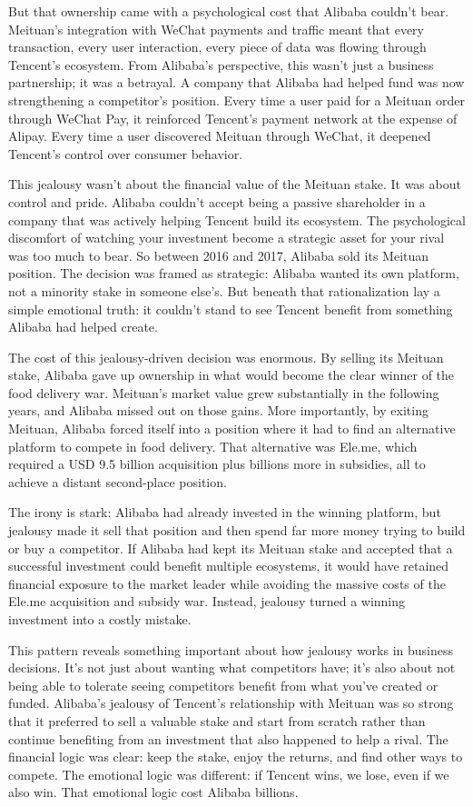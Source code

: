 But that ownership came with a psychological cost that Alibaba couldn't bear. Meituan's integration with WeChat payments and traffic meant that every transaction, every user interaction, every piece of data was flowing through Tencent's ecosystem. From Alibaba's perspective, this wasn't just a business partnership; it was a betrayal. A company that Alibaba had helped fund was now strengthening a competitor's position. Every time a user paid for a Meituan order through WeChat Pay, it reinforced Tencent's payment network at the expense of Alipay. Every time a user discovered Meituan through WeChat, it deepened Tencent's control over consumer behavior.

This jealousy wasn't about the financial value of the Meituan stake. It was about control and pride. Alibaba couldn't accept being a passive shareholder in a company that was actively helping Tencent build its ecosystem. The psychological discomfort of watching your investment become a strategic asset for your rival was too much to bear. So between 2016 and 2017, Alibaba sold its Meituan position. The decision was framed as strategic: Alibaba wanted its own platform, not a minority stake in someone else's. But beneath that rationalization lay a simple emotional truth: it couldn't stand to see Tencent benefit from something Alibaba had helped create.

The cost of this jealousy-driven decision was enormous. By selling its Meituan stake, Alibaba gave up ownership in what would become the clear winner of the food delivery war. Meituan's market value grew substantially in the following years, and Alibaba missed out on those gains. More importantly, by exiting Meituan, Alibaba forced itself into a position where it had to find an alternative platform to compete in food delivery. That alternative was Ele.me, which required a USD 9.5 billion acquisition plus billions more in subsidies, all to achieve a distant second-place position.

The irony is stark: Alibaba had already invested in the winning platform, but jealousy made it sell that position and then spend far more money trying to build or buy a competitor. If Alibaba had kept its Meituan stake and accepted that a successful investment could benefit multiple ecosystems, it would have retained financial exposure to the market leader while avoiding the massive costs of the Ele.me acquisition and subsidy war. Instead, jealousy turned a winning investment into a costly mistake.

This pattern reveals something important about how jealousy works in business decisions. It's not just about wanting what competitors have; it's also about not being able to tolerate seeing competitors benefit from what you've created or funded. Alibaba's jealousy of Tencent's relationship with Meituan was so strong that it preferred to sell a valuable stake and start from scratch rather than continue benefiting from an investment that also happened to help a rival. The financial logic was clear: keep the stake, enjoy the returns, and find other ways to compete. The emotional logic was different: if Tencent wins, we lose, even if we also win. That emotional logic cost Alibaba billions.